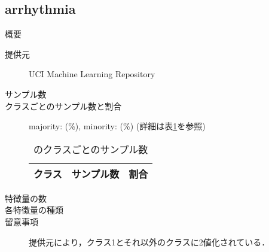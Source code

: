 \subsection{arrhythmia}
\begin{description}
    \item[概要] \cite{}
    \item[提供元] UCI Machine Learning Repository
    \item[サンプル数] 
    \item[クラスごとのサンプル数と割合] majority:  (\%), minority:  (\%) (詳細は表\ref{tab:}を参照)

        \begin{table}
            \centering
            \caption{のクラスごとのサンプル数}
            \label{tab:}
            \begin{tabular}{lrc} \hline
                \multicolumn{1}{c}{クラス}&
                \multicolumn{1}{c}{サンプル数}&
                \multicolumn{1}{c}{割合}\\
                \hline
                \hline

                \hline
            \end{tabular}
        \end{table}

    \item[特徴量の数] 
    \item[各特徴量の種類] \mbox{}
        
    \item[留意事項] 提供元により，クラス1とそれ以外のクラスに2値化されている．
\end{description}

